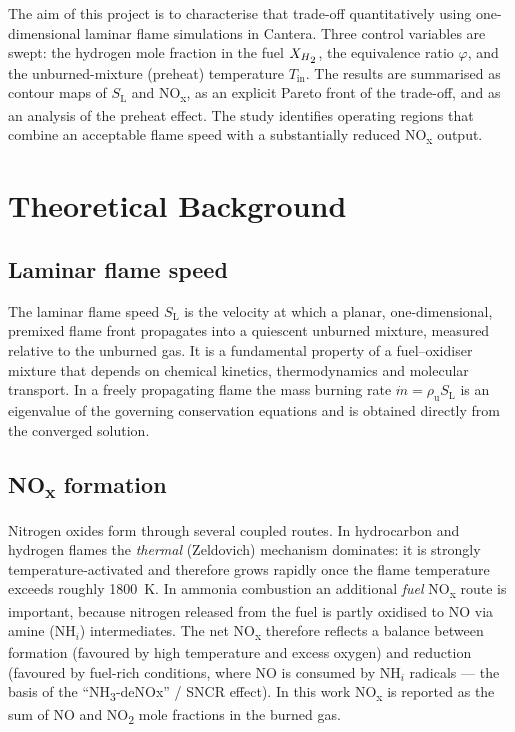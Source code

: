 \documentclass[12pt,a4paper]{article}
\newcommand{\NHH}{NH\textsubscript{3}}
\newcommand{\HH}{H\textsubscript{2}}
\newcommand{\NO}{NO}
\newcommand{\NOx}{NO\textsubscript{x}}
\newcommand{\NOO}{NO\textsubscript{2}}
\newcommand{\SL}{$S_\mathrm{L}$}
\newcommand{\phieq}{\varphi}
\newcommand{\XH}{$X_{\HH}$}
\begin{document}
The aim of this project is to characterise that trade-off quantitatively using
one-dimensional laminar flame simulations in Cantera. Three control variables
are swept: the hydrogen mole fraction in the fuel \XH{}, the equivalence ratio
$\phieq$, and the unburned-mixture (preheat) temperature $T_\mathrm{in}$. The
results are summarised as contour maps of \SL{} and \NOx{}, as an explicit
Pareto front of the trade-off, and as an analysis of the preheat effect. The
study identifies operating regions that combine an acceptable flame speed with
a substantially reduced \NOx{} output.

\section{Theoretical Background}

\subsection{Laminar flame speed}
The laminar flame speed \SL{} is the velocity at which a planar,
one-dimensional, premixed flame front propagates into a quiescent unburned
mixture, measured relative to the unburned gas. It is a fundamental property of
a fuel--oxidiser mixture that depends on chemical kinetics, thermodynamics and
molecular transport. In a freely propagating flame the mass burning rate
$\dot{m}=\rho_\mathrm{u} S_\mathrm{L}$ is an eigenvalue of the governing
conservation equations and is obtained directly from the converged solution.

\subsection{\NOx{} formation}
Nitrogen oxides form through several coupled routes. In hydrocarbon and
hydrogen flames the \emph{thermal} (Zeldovich) mechanism dominates: it is
strongly temperature-activated and therefore grows rapidly once the flame
temperature exceeds roughly \SI{1800}{\kelvin}. In ammonia combustion an
additional \emph{fuel} \NOx{} route is important, because nitrogen released from
the fuel is partly oxidised to \NO{} via amine ($\mathrm{NH}_i$) intermediates.
The net \NOx{} therefore reflects a balance between formation (favoured by high
temperature and excess oxygen) and reduction (favoured by fuel-rich conditions,
where \NO{} is consumed by $\mathrm{NH}_i$ radicals --- the basis of the
``\NHH{}-deNOx'' / SNCR effect). In this work \NOx{} is reported as the sum of
\NO{} and \NOO{} mole fractions in the burned gas.
\end{document}
